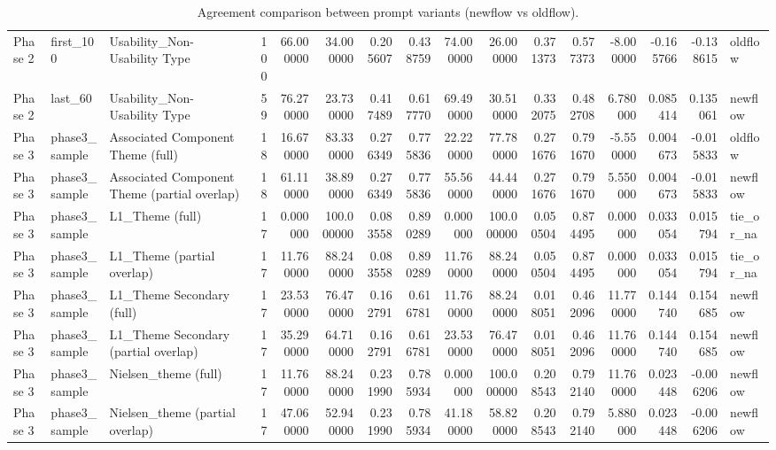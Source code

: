 \begin{table}[t]
\begin{tabular}{lllrrrrrrrrrrrrl}
Phase 2 & first_100 & Usability_Non-Usability Type & 100 & 66.000000 & 34.000000 & 0.205607 & 0.438759 & 74.000000 & 26.000000 & 0.371373 & 0.577373 & -8.000000 & -0.165766 & -0.138615 & oldflow \\
Phase 2 & last_60 & Usability_Non-Usability Type & 59 & 76.270000 & 23.730000 & 0.417489 & 0.617770 & 69.490000 & 30.510000 & 0.332075 & 0.482708 & 6.780000 & 0.085414 & 0.135061 & newflow \\
Phase 3 & phase3_sample & Associated Component Theme (full) & 18 & 16.670000 & 83.330000 & 0.276349 & 0.775836 & 22.220000 & 77.780000 & 0.271676 & 0.791670 & -5.550000 & 0.004673 & -0.015833 & oldflow \\
Phase 3 & phase3_sample & Associated Component Theme (partial overlap) & 18 & 61.110000 & 38.890000 & 0.276349 & 0.775836 & 55.560000 & 44.440000 & 0.271676 & 0.791670 & 5.550000 & 0.004673 & -0.015833 & newflow \\
Phase 3 & phase3_sample & L1_Theme (full) & 17 & 0.000000 & 100.000000 & 0.083558 & 0.890289 & 0.000000 & 100.000000 & 0.050504 & 0.874495 & 0.000000 & 0.033054 & 0.015794 & tie_or_na \\
Phase 3 & phase3_sample & L1_Theme (partial overlap) & 17 & 11.760000 & 88.240000 & 0.083558 & 0.890289 & 11.760000 & 88.240000 & 0.050504 & 0.874495 & 0.000000 & 0.033054 & 0.015794 & tie_or_na \\
Phase 3 & phase3_sample & L1_Theme Secondary (full) & 17 & 23.530000 & 76.470000 & 0.162791 & 0.616781 & 11.760000 & 88.240000 & 0.018051 & 0.462096 & 11.770000 & 0.144740 & 0.154685 & newflow \\
Phase 3 & phase3_sample & L1_Theme Secondary (partial overlap) & 17 & 35.290000 & 64.710000 & 0.162791 & 0.616781 & 23.530000 & 76.470000 & 0.018051 & 0.462096 & 11.760000 & 0.144740 & 0.154685 & newflow \\
Phase 3 & phase3_sample & Nielsen_theme (full) & 17 & 11.760000 & 88.240000 & 0.231990 & 0.785934 & 0.000000 & 100.000000 & 0.208543 & 0.792140 & 11.760000 & 0.023448 & -0.006206 & newflow \\
Phase 3 & phase3_sample & Nielsen_theme (partial overlap) & 17 & 47.060000 & 52.940000 & 0.231990 & 0.785934 & 41.180000 & 58.820000 & 0.208543 & 0.792140 & 5.880000 & 0.023448 & -0.006206 & newflow \\
\bottomrule
\end{tabular}
\caption{Agreement comparison between prompt variants (newflow vs oldflow).}
\label{tab:prompt-agreement-comparison}

\end{table}
